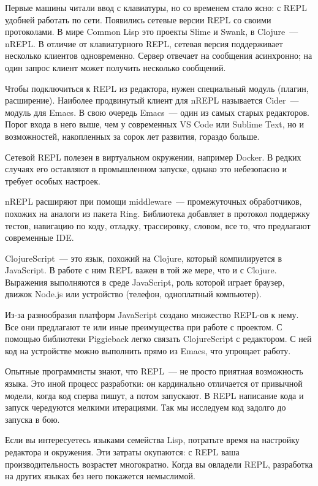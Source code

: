 Первые машины читали ввод с клавиатуры, но со временем стало ясно: с REPL удобней работать по сети. Появились сетевые версии REPL со своими протоколами. В мире Common Lisp это проекты Slime и Swank, в Clojure~--- nREPL. В отличие от клавиатурного REPL, сетевая версия поддерживает несколько клиентов одновременно. Сервер отвечает на сообщения асинхронно; на один запрос клиент может получить несколько сообщений.

Чтобы подключиться к REPL из редактора, нужен специальный модуль (плагин, расширение). Наиболее продвинутый клиент для nREPL называется Cider~--- модуль для Emacs. В свою очередь Emacs~--- один из самых старых редакторов. Порог входа в него выше, чем у современных VS Code или Sublime Text, но и возможностей, накопленных за сорок лет развития, гораздо больше.

Сетевой REPL полезен в виртуальном окружении, например Docker. В редких случаях его оставляют в промышленном запуске, однако это небезопасно и требует особых настроек.

nREPL расширяют при помощи middleware~--- промежуточных обработчиков, похожих на аналоги из пакета Ring. Библиотека  добавляет в протокол поддержку тестов, навигацию по коду, отладку, трассировку, словом, все то, что предлагают современные IDE.

ClojureScript~--- это язык, похожий на Clojure, который компилируется в JavaScript. В работе с ним REPL важен в той же мере, что и с Clojure. Выражения выполняются в среде JavaScript, роль которой играет браузер, движок Node.js или устройство (телефон, одноплатный компьютер).

Из-за разнообразия платформ JavaScript создано множество REPL-ов к нему. Все они предлагают те или иные преимущества при работе с проектом. С помощью библиотеки Piggieback легко связать ClojureScript с редактором. С ней код на устройстве можно выполнить прямо из Emacs, что упрощает работу.

Опытные программисты знают, что REPL~--- не просто приятная возможность языка. Это иной процесс разработки: он кардинально отличается от привычной модели, когда код сперва пишут, а потом запускают. В REPL написание кода и запуск чередуются мелкими итерациями. Так мы исследуем код задолго до запуска в бою.

Если вы интересуетесь языками семейства Lisp, потратьте время на настройку редактора и окружения. Эти затраты окупаются: с REPL ваша производительность возрастет многократно. Когда вы овладели REPL, разработка на других языках без него покажется немыслимой.
